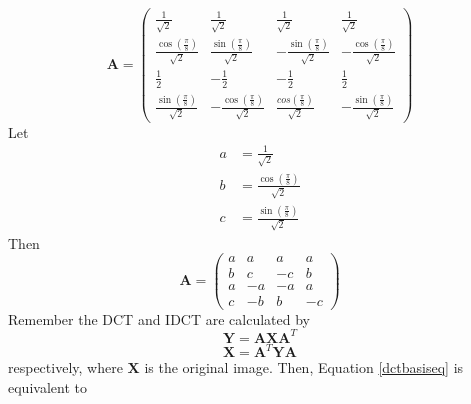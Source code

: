 \documentclass[a4paper,12pt,twoside]{article}
\begin{document}
\begin{equation}
    \mathbf{A}=\begin{pmatrix}
        \frac{1}{\sqrt{2}}&\frac{1}{\sqrt{2}}&\frac{1}{\sqrt{2}}&\frac{1}{\sqrt{2}}\\
        \frac{\cos{\left(\frac{\pi}{8}\right)}}{\sqrt{2}}&\frac{\sin{\left(\frac{\pi}{8}\right)}}{\sqrt{2}}&-\frac{\sin{\left(\frac{\pi}{8}\right)}}{\sqrt{2}}&-\frac{\cos{\left(\frac{\pi}{8}\right)}}{\sqrt{2}}\\
        \frac{1}{2}&-\frac{1}{2}&-\frac{1}{2}&\frac{1}{2}\\
        \frac{\sin{\left(\frac{\pi}{8}\right)}}{\sqrt{2}}&-\frac{\cos{\left(\frac{\pi}{8}\right)}}{\sqrt{2}}&\frac{cos{\left(\frac{\pi}{8}\right)}}{\sqrt{2}}&-\frac{\sin{\left(\frac{\pi}{8}\right)}}{\sqrt{2}}
    \end{pmatrix}
\end{equation}
Let
\begin{equation}
    \begin{array}{ll}
    a&=\frac{1}{\sqrt{2}}\\
    b&=\frac{\cos{\left(\frac{\pi}{8}\right)}}{\sqrt{2}}\\
    c&=\frac{\sin{\left(\frac{\pi}{8}\right)}}{\sqrt{2}}
    \end{array}
\end{equation}
Then
\begin{equation}
    \mathbf{A}=\begin{pmatrix}
        a&a&a&a\\
        b&c&-c&b\\
        a&-a&-a&a\\
        c&-b&b&-c
    \end{pmatrix}
\end{equation}
Remember the DCT and IDCT are calculated by
\begin{equation}\label{dctbasiseq}
    \mathbf{Y}=\mathbf{AXA}^T
\end{equation}
\begin{equation}
    \mathbf{X}=\mathbf{A}^T\mathbf{YA}
\end{equation}
respectively, where $\mathbf{X}$ is the original image. Then, Equation \ref{dctbasiseq} is equivalent to
\end{document}
